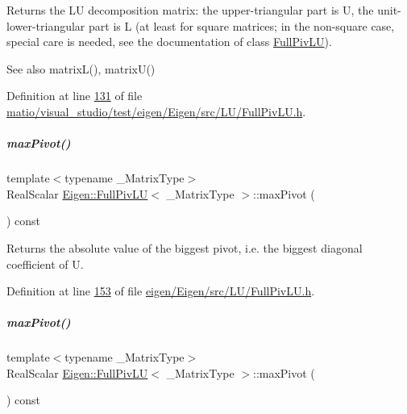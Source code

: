 \begin{DoxyReturn}{Returns}
the LU decomposition matrix\+: the upper-\/triangular part is U, the unit-\/lower-\/triangular part is L (at least for square matrices; in the non-\/square case, special care is needed, see the documentation of class \hyperlink{group___l_u___module_class_eigen_1_1_full_piv_l_u}{Full\+Piv\+LU}).
\end{DoxyReturn}
\begin{DoxySeeAlso}{See also}
matrix\+L(), matrix\+U() 
\end{DoxySeeAlso}


Definition at line \hyperlink{matio_2visual__studio_2test_2eigen_2_eigen_2src_2_l_u_2_full_piv_l_u_8h_source_l00131}{131} of file \hyperlink{matio_2visual__studio_2test_2eigen_2_eigen_2src_2_l_u_2_full_piv_l_u_8h_source}{matio/visual\+\_\+studio/test/eigen/\+Eigen/src/\+L\+U/\+Full\+Piv\+L\+U.\+h}.

\mbox{\label{group___l_u___module_abced9f280f5fc49c2e62605c782b237b}} 
\subparagraph{\texorpdfstring{max\+Pivot()}{maxPivot()}\hspace{0.1cm}{\footnotesize\ttfamily [1/2]}}
{\footnotesize\ttfamily template$<$typename \+\_\+\+Matrix\+Type$>$ \\
Real\+Scalar \hyperlink{group___l_u___module_class_eigen_1_1_full_piv_l_u}{Eigen\+::\+Full\+Piv\+LU}$<$ \+\_\+\+Matrix\+Type $>$\+::max\+Pivot (\begin{DoxyParamCaption}{ }\end{DoxyParamCaption}) const\hspace{0.3cm}{\ttfamily [inline]}}

\begin{DoxyReturn}{Returns}
the absolute value of the biggest pivot, i.\+e. the biggest diagonal coefficient of U. 
\end{DoxyReturn}


Definition at line \hyperlink{eigen_2_eigen_2src_2_l_u_2_full_piv_l_u_8h_source_l00153}{153} of file \hyperlink{eigen_2_eigen_2src_2_l_u_2_full_piv_l_u_8h_source}{eigen/\+Eigen/src/\+L\+U/\+Full\+Piv\+L\+U.\+h}.

\mbox{\label{group___l_u___module_abced9f280f5fc49c2e62605c782b237b}} 
\subparagraph{\texorpdfstring{max\+Pivot()}{maxPivot()}\hspace{0.1cm}{\footnotesize\ttfamily [2/2]}}
{\footnotesize\ttfamily template$<$typename \+\_\+\+Matrix\+Type$>$ \\
Real\+Scalar \hyperlink{group___l_u___module_class_eigen_1_1_full_piv_l_u}{Eigen\+::\+Full\+Piv\+LU}$<$ \+\_\+\+Matrix\+Type $>$\+::max\+Pivot (\begin{DoxyParamCaption}{ }\end{DoxyParamCaption}) const\hspace{0.3cm}{\ttfamily [inline]}}


